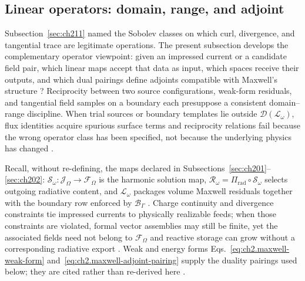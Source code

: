 \subsection{Linear operators: domain, range, and adjoint}
\label{sec:ch212}

Subsection~\ref{sec:ch211} named the Sobolev classes on which curl, divergence, and tangential trace are legitimate operations. The present subsection develops the complementary operator viewpoint: given an impressed current or a candidate field pair, which linear maps accept that data as input, which spaces receive their outputs, and which dual pairings define adjoints compatible with Maxwell's structure \cite{stratton1941,harrington2001}? Reciprocity between two source configurations, weak-form residuals, and tangential field samples on a boundary each presuppose a consistent domain--range discipline. When trial sources or boundary templates lie outside \(\mathcal{D}(\mathcal{L}_\omega)\), flux identities acquire spurious surface terms and reciprocity relations fail because the wrong operator class has been specified, not because the underlying physics has changed \cite{devaney2004,stratton1941}.

Recall, without re-defining, the maps declared in Subsections~\ref{sec:ch201}--\ref{sec:ch202}: \(\mathcal{S}_\omega:\mathcal{J}_\Omega\to\mathcal{F}_\Omega\) is the harmonic solution map, \(\mathcal{R}_\omega=\Pi_{\mathrm{rad}}\circ\mathcal{S}_\omega\) selects outgoing radiative content, and \(\mathcal{L}_\omega\) packages volume Maxwell residuals together with the boundary row enforced by \(\mathcal{B}_\Gamma\) \cite{harrington2001}. Charge continuity and divergence constraints tie impressed currents to physically realizable feeds; when those constraints are violated, formal vector assemblies may still be finite, yet the associated fields need not belong to \(\mathcal{F}_\Omega\) and reactive storage can grow without a corresponding radiative export \cite{maxwell1873,stratton1941}. Weak and energy forms Eqs.~\eqref{eq:ch2.maxwell-weak-form} and~\eqref{eq:ch2.maxwell-adjoint-pairing} supply the duality pairings used below; they are cited rather than re-derived here \cite{stratton1941}.

